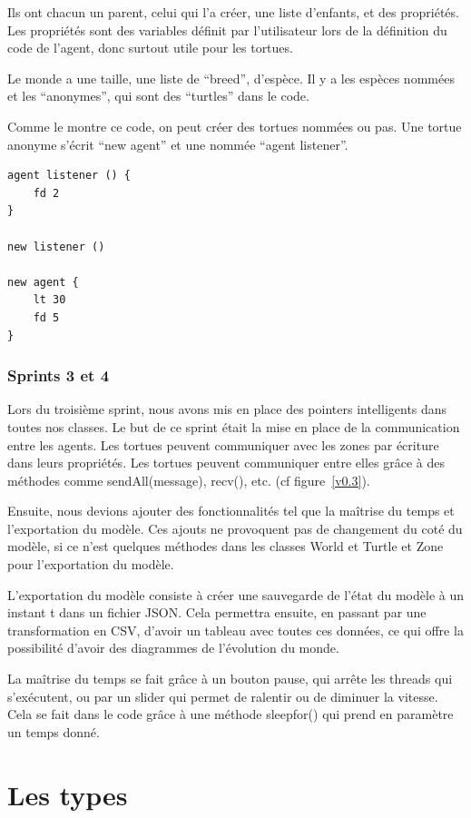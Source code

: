 Ils ont chacun un parent, celui qui l'a créer, une liste d'enfants, et des propriétés. Les propriétés sont des variables définit par l'utilisateur lors de la définition du code de l'agent, donc surtout utile pour les tortues.

Le monde a une taille, une liste de \enquote{breed}, d'espèce. Il y a les espèces nommées et les \enquote{anonymes}, qui sont des \enquote{turtles} dans le code.

Comme le montre ce code, on peut créer des tortues nommées ou pas. Une tortue anonyme s'écrit \enquote{new agent} et une nommée \enquote{agent listener}.

\begin{lstlisting}
agent listener () {
	fd 2
}

new listener ()

new agent {
	lt 30
	fd 5
}
\end{lstlisting}
\subsubsection{Sprints 3 et 4}
Lors du troisième sprint, nous avons mis en place des pointers intelligents dans toutes nos classes. Le but de ce sprint était la mise en place de la communication entre les agents. Les tortues peuvent communiquer avec les zones par écriture dans leurs propriétés. Les tortues peuvent communiquer entre elles grâce à des méthodes comme sendAll(message), recv(), etc.
(cf figure~\ref{v0.3}).

Ensuite, nous devions ajouter des fonctionnalités tel que la maîtrise du temps et l'exportation du modèle. Ces ajouts ne provoquent pas de changement du coté du modèle, si ce n'est quelques méthodes dans les classes World et Turtle et Zone pour l'exportation du modèle.

L'exportation du modèle consiste à créer une sauvegarde de l'état du modèle à un instant t dans un fichier JSON.
Cela permettra ensuite, en passant par une transformation en CSV, d'avoir un tableau avec toutes ces données, ce qui offre la possibilité d'avoir des diagrammes de l'évolution du monde.

La maîtrise du temps se fait grâce à un bouton pause, qui arrête les threads qui s'exécutent, ou par un slider qui permet de ralentir ou de diminuer la vitesse. Cela se fait dans le code grâce à une méthode sleepfor() qui prend en paramètre un temps donné.

\section{Les types}
